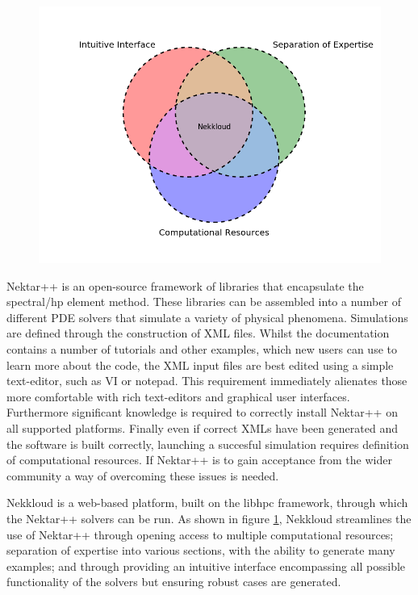 \documentclass[11pt, a4paper]{report}
\begin{document}
\begin{figure}[htb!]
 \centering
 \includegraphics[width=.75\linewidth,  clip=true, trim = .4cm .4cm .4cm .4cm]{venn_diagram}
 \label{fig:venn_diagram}
\end{figure}

Nektar++\cite{Nektar2015} is an open-source framework of libraries that encapsulate the spectral/hp element method. These libraries can be assembled into a number of different PDE solvers that simulate a variety of physical phenomena. Simulations are defined through the construction of XML\cite{Solo_etal2002} files. Whilst the documentation contains a number of tutorials and other examples, which new users can use to learn more about the code, the XML input files are best edited using a simple text-editor, such as VI or notepad. This requirement immediately alienates those more comfortable with rich text-editors and graphical user interfaces. Furthermore significant knowledge is required to correctly install Nektar++ on all supported platforms. Finally even if correct XMLs have been generated and the software is built correctly, launching a succesful simulation requires definition of computational resources. If Nektar++ is to gain acceptance from the wider community a way of overcoming these issues is needed.

Nekkloud\cite{Cohen_etal2013} is a web-based platform, built on the libhpc framework, through which the Nektar++ solvers can be run. As shown in figure \ref{fig:venn_diagram}, Nekkloud streamlines the use of Nektar++ through opening access to multiple computational resources; separation of expertise into various sections, with the ability to generate many examples; and through providing an intuitive interface encompassing all possible functionality of the solvers but ensuring robust cases are generated.
\end{document}
